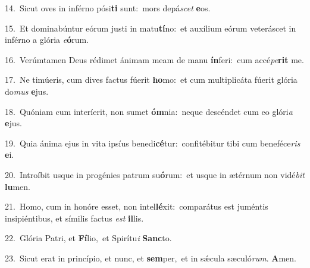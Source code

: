 {\numbfont\textcolor{\numbcolor}{14.}}~Sicut oves in inférno pósi\textbf{ti} sunt:~\star mors depá\textit{scet} \textbf{e}\-os.\par
{\numbfont\textcolor{\numbcolor}{15.}}~Et dominabúntur eórum justi in matu\-\textbf{tí}\-no:~\star et auxílium eórum veteráscet in inférno a glória \textit{e}\-\textbf{ó}rum.\par
{\numbfont\textcolor{\numbcolor}{16.}}~Verúmtamen Deus rédimet ánimam meam de manu \textbf{ín}\-feri:~\star cum accé\-\textit{pe}\-\textbf{rit} me.\par
{\numbfont\textcolor{\numbcolor}{17.}}~Ne timúeris, cum dives factus fúerit \textbf{ho}\-mo:~\star et cum multiplicáta fúerit glória do\textit{mus} \textbf{e}\-jus.\par
{\numbfont\textcolor{\numbcolor}{18.}}~Quóniam cum interíerit, non sumet \textbf{óm}\-nia:~\star neque descéndet cum eo glóri\textit{a} \textbf{e}\-jus.\par
{\numbfont\textcolor{\numbcolor}{19.}}~Quia ánima ejus in vita ipsíus benedi\-\textbf{cé}\-tur:~\star confitébitur tibi cum beneféce\textit{ris} \textbf{e}\-i.\par
{\numbfont\textcolor{\numbcolor}{20.}}~Introíbit usque in progénies patrum su\-\textbf{ó}\-rum:~\star et usque in ætérnum non vidé\textit{bit} \textbf{lu}\-men.\par
{\numbfont\textcolor{\numbcolor}{21.}}~Homo, cum in honóre esset, non intel\-\textbf{lé}\-xit:~\star comparátus est juméntis insipiéntibus, et símilis factus \textit{est} \textbf{il}\-lis.\par
{\numbfont\textcolor{\numbcolor}{22.}}~Glória Patri, et \textbf{Fí}\-lio,~\star et Spirítu\textit{i} \textbf{Sanc}\-to.\par
{\numbfont\textcolor{\numbcolor}{23.}}~Sicut erat in princípio, et nunc, et \textbf{sem}\-per,~\star et in sǽcula sæculó\-\textit{rum}\-. \textbf{A}\-men.\par
